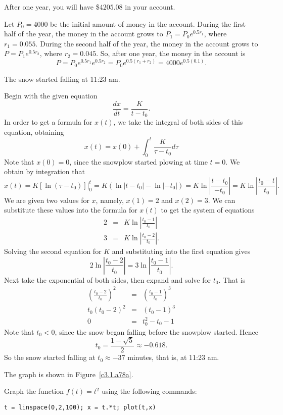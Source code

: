  \ans After one year, you will have \$$4205.08$ in your account.

\soln Let $P_0 = 4000$ be the initial amount of money in the account. 
During the first half of the year, the money in the account grows to $P_1 =
P_0e^{0.5r_1}$, where $r_1 = 0.055$.  During the second half of the year,
the money in the account grows to $P = P_1e^{0.5r_2}$, where $r_2 = 0.045$.
So, after one year, the money in the account is
\[
P = P_0e^{0.5r_1}e^{0.5r_2} = P_0e^{0.5(r_1 + r_2)} = 4000e^{0.5(0.1)}.
\]

\ans The snow started falling at 11:23 am.

\soln Begin with the given equation
\[
\frac{dx}{dt} = \frac{K}{t-t_0}.
\]
In order to get a formula for $x(t)$, we take the integral of both sides of
this equation, obtaining
\[
x(t) = x(0) + \int_{0}^{t} \frac{K}{\tau-t_0} d\tau
\]
Note that $x(0) = 0$, since the snowplow started plowing at time $t=0$.  We
obtain by integration that
\[
x(t) = \left.K[\ln(\tau - t_0)]\right|_{0}^{t} = K(\ln|t - t_0| - \ln|-t_0|) = 
K\ln\left|\frac{t - t_0}{-t_0}\right| = K\ln\left|\frac{t_0-t}{t_0}\right|.
\]
We are given two values for $x$, namely, $x(1) = 2$ and $x(2) = 3$.  We can
substitute these values into the formula for $x(t)$ to get the system of 
equations
\[
\begin{array}{rcl}
2 & = & K\ln\left|\frac{t_0 - 1}{t_0}\right| \\
3 & = & K\ln\left|\frac{t_0 - 2}{t_0}\right|.
\end{array}
\]
Solving the second equation for $K$ and substituting into the first equation 
gives
\[
2\ln\left|\frac{t_0 - 2}{t_0}\right| = 3\ln\left|\frac{t_0 - 1}{t_0}\right|.
\]
Next take the exponential of both sides, then expand and solve for $t_0$. 
That is
\[
\begin{array}{rcl}
\left(\frac{t_0 - 2}{t_0}\right)^2 & = & \left(\frac{t_0 - 1}{t_0}\right)^3 \\
t_0\left(t_0 - 2\right)^2 & = & \left(t_0 - 1\right)^3 \\
0 & = & t_0^2 - t_0 - 1 \end{array}
\]
Note that $t_0 < 0$, since the snow began falling before the snowplow
started.  Hence
\[
t_0 = \frac{1 - \sqrt{5}}{2} \approx -0.618.
\]
So the snow started falling at $t_0 \approx -37$ minutes, that is, at
11:23 am.


\ans The graph is shown in Figure~\ref{c3.1.a78a}.

\soln Graph the function $f(t) = t^2$ using the following \Matlab commands:
\begin{verbatim}
t = linspace(0,2,100); x = t.*t; plot(t,x)
\end{verbatim}

